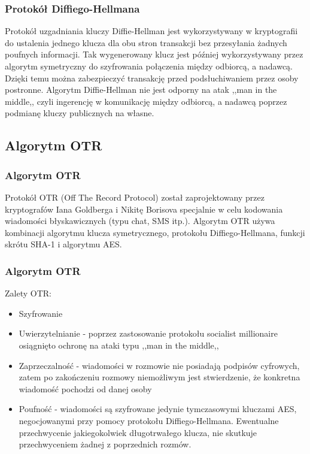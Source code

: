 \documentclass[xcolor=table]{beamer}
\begin{document}
\begin{frame}
  \frametitle{Protokół Diffiego-Hellmana}
	
Protokół uzgadniania kluczy Diffie-Hellman jest wykorzystywany w kryptografii
do ustalenia jednego klucza dla obu stron transakcji bez przesyłania żadnych 
poufnych informacji. Tak wygenerowany klucz jest później wykorzystywany przez
 algorytm symetryczny do szyfrowania połączenia między odbiorcą, a nadawcą. 
 Dzięki temu można zabezpieczyć transakcję przed podsłuchiwaniem przez osoby 
 postronne. Algorytm Diffie-Hellman nie jest odporny na atak 
 ,,man in the middle,, czyli ingerencję w komunikację między odbiorcą, 
 a nadawcą poprzez podmianę kluczy publicznych na własne.

\end{frame}


\subsection{Algorytm OTR}

\begin{frame}
  \frametitle{Algorytm OTR}
	
Protokół OTR (Off The Record Protocol) został zaprojektowany przez kryptografów Iana Goldberga i Nikitę Borisova
specjalnie w celu kodowania wiadomości błyskawicznych (typu chat, SMS itp.).
Algorytm OTR używa kombinacji algorytmu klucza symetrycznego, 
protokołu Diffiego-Hellmana, funkcji skrótu SHA-1 i algorytmu AES. 

\end{frame}

\begin{frame}
  \frametitle{Algorytm OTR}

Zalety OTR:
\begin{itemize}
\item Szyfrowanie
\item Uwierzytelnianie - poprzez zastosowanie protokołu socialist millionaire 
osiągnięto ochronę na ataki typu ,,man in the middle,,
\item Zaprzeczalność - wiadomości w rozmowie nie posiadają podpisów cyfrowych,
zatem po zakończeniu rozmowy niemożliwym jest stwierdzenie, że konkretna 
wiadomość pochodzi od danej osoby
\item Poufność - wiadomości są szyfrowane jedynie tymczasowymi kluczami AES, negocjowanymi przy pomocy protokołu Diffiego-Hellmana. Ewentualne przechwycenie jakiegokolwiek długotrwałego klucza, nie skutkuje przechwyceniem żadnej z poprzednich rozmów.
\end{itemize}
\end{frame}
\end{document}
